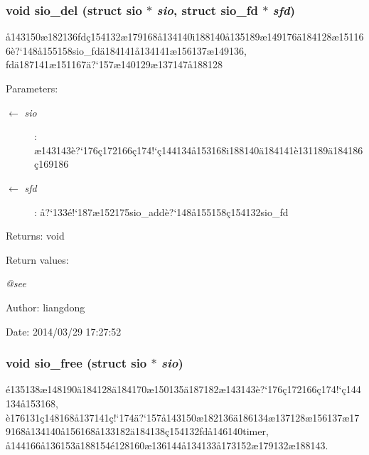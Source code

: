\subsubsection{\setlength{\rightskip}{0pt plus 5cm}void sio\_\-del (struct sio $\ast$ {\em sio}, struct sio\_\-fd $\ast$ {\em sfd})}\label{sio_8h_a8}


\aa{}143150\ae{}182136fd\c{c}154132\ae{}179168\aa{}134140\"{\i}188140\aa{}135189\ae{}149176\"{a}184128\ae{}151166\`{e}?`148\aa{}155158sio\_\-fd\"{a}184141\aa{}134141\ae{}156137\ae{}149136, fd\"{a}187141\ae{}151167\"{a}?`157\ae{}140129\ae{}137147\aa{}188128 

\begin{Desc}
\item[Parameters:]
\begin{description}
\item[\mbox{$\leftarrow$} {\em sio}]: \ae{}143143\`{e}?`176\c{c}172166\c{c}174!`\c{c}144134\aa{}153168\"{\i}188140\"{a}184141\`{e}131189\"{a}184186\c{c}169186 \item[\mbox{$\leftarrow$} {\em sfd}]: \aa{}?`133\'{e}!`187\ae{}152175sio\_\-add\`{e}?`148\aa{}155158\c{c}154132sio\_\-fd \end{description}
\end{Desc}
\begin{Desc}
\item[Returns:]void \end{Desc}
\begin{Desc}
\item[Return values:]
\begin{description}
\item[{\em @see}]\end{description}
\end{Desc}
\begin{Desc}
\item[Author:]liangdong \end{Desc}
\begin{Desc}
\item[Date:]2014/03/29 17:27:52 \end{Desc}
\subsubsection{\setlength{\rightskip}{0pt plus 5cm}void sio\_\-free (struct sio $\ast$ {\em sio})}\label{sio_8h_a5}


\'{e}135138\ae{}148190\"{a}184128\"{a}184170\ae{}150135\"{a}187182\ae{}143143\`{e}?`176\c{c}172166\c{c}174!`\c{c}144134\aa{}153168, \`{e}176131\c{c}148168\aa{}137141\c{c}!`174\"{a}?`157\aa{}143150\ae{}182136\"{a}186134\ae{}137128\ae{}156137\ae{}179168\aa{}134140\aa{}156168\aa{}133182\"{a}184138\c{c}154132fd\aa{}146140timer, \aa{}144166\aa{}136153\"{a}188154\'{e}128160\ae{}136144\aa{}134133\aa{}173152\ae{}179132\ae{}188143. 

